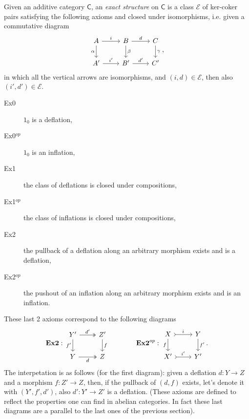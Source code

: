 \begin{defn}
	Given an additive category $\mathsf{C}$, an {\em exact structure} on $\mathsf{C}$
	is a class $\mathcal{E}$ of ker-coker pairs satisfying the following axioms and closed under isomorphisms, i.e.
	given a commutative diagram
	\begin{equation}
	\begin{tikzcd}
		A \arrow[r, "i", rightarrow] \arrow[d, "\alpha"', rightarrow] &
		B \arrow[r, "d", rightarrow] \arrow[d, "\beta", rightarrow] &
		C \arrow[d, "\gamma", rightarrow] \\
		A' \arrow[r, "i'", rightarrow] &
		B' \arrow[r, "d'", rightarrow] &
		C'
	\end{tikzcd}
	,\end{equation} 
	in which all the vertical arrows are isomorphisms, and $\left(i, d\right) \in \mathcal{E}$, then also $\left(i', d'\right) \in \mathcal{E}$.
	\begin{description}
		\item[Ex0] $1_0$ is a deflation,
		\item[Ex0$^{op}$] $1_0$ is an inflation,
		\item[Ex1] the class of deflations is closed under compositions,
		\item[Ex1$^{op}$] the class of inflations is closed under compositions,
		\item[Ex2] the pullback of a deflation along an arbitrary morphism exists and is a deflation,
		\item[Ex2$^{op}$] the pushout of an inflation along an arbitrary morphism exists and is an inflation.
	\end{description} 
	These last 2 axioms correspond to the following diagrams
	\begin{equation}
	\mathbf{Ex2}:
	\begin{tikzcd}
		Y' \arrow[r, "d'", twoheadrightarrow] \arrow[d, "f'"', rightarrow] &
		Z' \arrow[d, "f", rightarrow] \\
		Y \arrow[r, "d"', twoheadrightarrow] &
		Z
	\end{tikzcd}\quad\quad\quad\quad
	\mathbf{Ex2}^{op}:
	\begin{tikzcd}
		X \arrow[r, "i", tail] \arrow[d, "f"', rightarrow] &
		Y \arrow[d, "f'", rightarrow] \\
		X' \arrow[r, "i'", tail] &
		Y'
	\end{tikzcd}
	.\end{equation} 
	The interpetation is as follows (for the first diagram):
	given a deflation $d\colon Y \to Z$ and a morphism $f\colon Z' \to Z$, then,
	if the pullback of $\left(d, f\right)$ exists, let's denote it with $\left(Y', f', d'\right)$, also $d'\colon Y' \to Z'$ is a deflation.
	(These axioms are defined to reflect the properties one can find
	in abelian categories.
	In fact these last diagrams are a parallel to the last ones of the previous section).
\end{defn}

